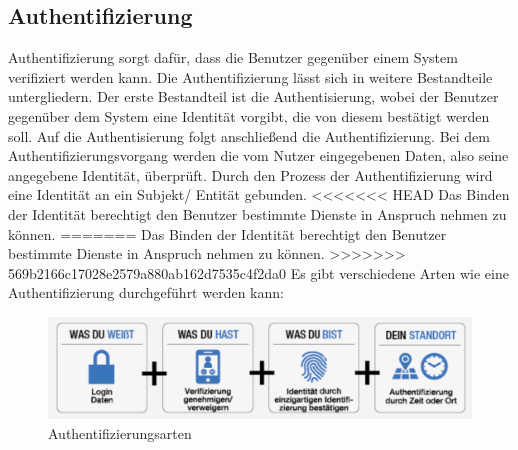 \documentclass[utf8,biblatex]{lni}
\begin{document}
\subsection{Authentifizierung}

Authentifizierung sorgt dafür, dass die Benutzer gegenüber einem System verifiziert werden kann.
Die Authentifizierung lässt sich in weitere Bestandteile untergliedern. Der erste Bestandteil ist die Authentisierung, 
wobei der Benutzer gegenüber dem System eine Identität vorgibt, die von diesem bestätigt werden soll. 
Auf die Authentisierung folgt anschließend die Authentifizierung. Bei dem Authentifizierungsvorgang werden die vom Nutzer 
eingegebenen Daten, also seine angegebene Identität, überprüft.  
Durch den Prozess der Authentifizierung wird eine Identität an ein Subjekt/ Entität gebunden. 
<<<<<<< HEAD
Das Binden der Identität berechtigt den Benutzer bestimmte Dienste in Anspruch nehmen zu können. \cite{Kriha.2008}
=======
Das Binden der Identität berechtigt den Benutzer bestimmte Dienste in Anspruch nehmen zu können. \cite{Pfitzmann.}
>>>>>>> 569b2166c17028e2579a880ab162d7535c4f2da0
\newline
Es gibt verschiedene Arten wie eine Authentifizierung durchgeführt werden kann:
\begin{figure}
    \centering
    \includegraphics[width=\textwidth]{images/authent_pos1.png}
    \caption[Authentifizierungsarten]{Authentifizierungsarten} 
    \label{Authentifizierungsarten}
\end{figure} 
\end{document}
